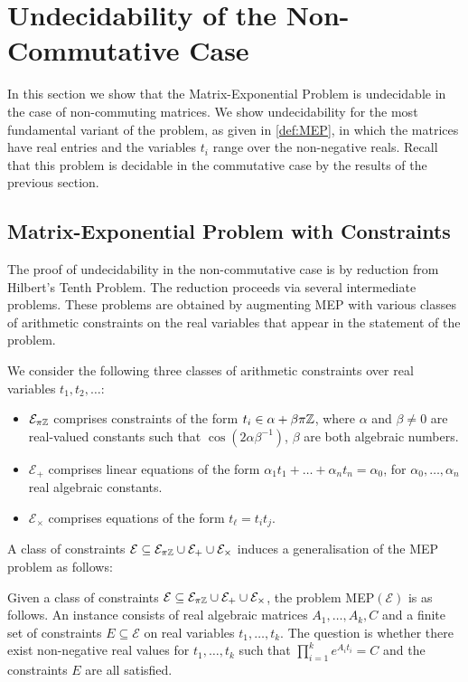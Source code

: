 \section{Undecidability of the Non-Commutative Case}
\label{sec:lics_encoding}

In this section we show that the Matrix-Exponential Problem is
undecidable in the case of non-commuting matrices.  We show
undecidability for the most fundamental variant of the problem, as
given in \cref{def:MEP}, in which the matrices have real
entries and the variables $t_i$ range over the non-negative reals.
Recall that this problem is decidable in the commutative case by the
results of the previous section.

\subsection{Matrix-Exponential Problem with Constraints}

The proof of undecidability in the non-commutative case is by
reduction from Hilbert's Tenth Problem.  The reduction proceeds via
several intermediate problems.  These problems are obtained by
augmenting MEP with various classes of arithmetic constraints on the
real variables that appear in the statement of the problem.

\begin{definition}
  We consider the following three classes of arithmetic constraints
  over real variables $t_1,t_2,\ldots$:
\begin{itemize}
\item $\mathcal{E}_{\pi\mathbb{Z}}$ comprises constraints of the form
  $t_i\in\alpha+\beta\pi\mathbb{Z}$, where $\alpha$ and $\beta\neq 0$
  are real-valued constants such that $\cos(2\alpha\beta^{-1})$,
  $\beta$ are both algebraic numbers.
\item $\mathcal{E}_{+}$ comprises linear equations of the form
  $\alpha_1 t_1 + \ldots + \alpha_n t_n = \alpha_0 $, for
  $\alpha_0,\ldots,\alpha_n$ real algebraic constants.
\item $\mathcal{E}_{\times}$ comprises equations of the form
  $t_\ell=t_it_j$.
\end{itemize}
\end{definition}

A class of constraints $\mathcal{E} \subseteq \mathcal{E}_{\pi\mathbb{Z}} \cup
\mathcal{E}_{+}\cup \mathcal{E}_{\times}$
induces a generalisation of the MEP problem as follows:
\begin{definition}
  Given a class of constraints
  $\mathcal{E} \subseteq \mathcal{E}_{\pi\mathbb{Z}} \cup
  \mathcal{E}_{+}\cup \mathcal{E}_{\times}$,
  the problem MEP$(\mathcal{E})$ is as follows.  An instance consists
  of real algebraic matrices $A_1,\ldots,A_k,C$ and a finite set of
  constraints $E\subseteq\mathcal{E}$ on real variables
  $t_1,\ldots,t_k$.  The question is whether there exist non-negative
  real values for $t_1,\ldots,t_k$ such that
  $\prod_{i=1}^ke^{A_it_i}=C$ and the constraints $E$ are all
  satisfied.
\label{def:contraintMEP}
\end{definition}

